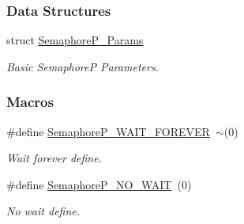 \subsubsection*{Data Structures}
\begin{DoxyCompactItemize}
\item 
struct \hyperlink{struct_semaphore_p___params}{Semaphore\+P\+\_\+\+Params}
\begin{DoxyCompactList}\small\item\em Basic Semaphore\+P Parameters. \end{DoxyCompactList}\end{DoxyCompactItemize}
\subsubsection*{Macros}
\begin{DoxyCompactItemize}
\item 
\#define \hyperlink{_semaphore_p_8h_a6d1991df030b91d441c8bc886739c29d}{Semaphore\+P\+\_\+\+W\+A\+I\+T\+\_\+\+F\+O\+R\+E\+V\+E\+R}~$\sim$(0)
\begin{DoxyCompactList}\small\item\em Wait forever define. \end{DoxyCompactList}\item 
\#define \hyperlink{_semaphore_p_8h_a39cd521223b38fd00a334c57929c67c7}{Semaphore\+P\+\_\+\+N\+O\+\_\+\+W\+A\+I\+T}~(0)
\begin{DoxyCompactList}\small\item\em No wait define. \end{DoxyCompactList}\end{DoxyCompactItemize}
